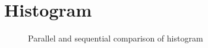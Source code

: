\section{Histogram}
\label{sec:histogram}

\begin{figure}[htb]
  \centering
  
  \caption{Parallel and sequential comparison of histogram}
  \label{fig:par seq histogram}
\end{figure}
